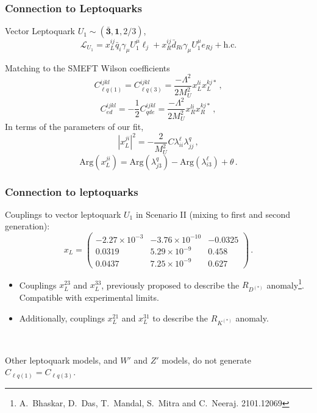 \documentclass[mathserif, 10pt]{beamer}
\begin{document}
\begin{frame}
\frametitle{Connection to Leptoquarks}

Vector Leptoquark $U_1 \sim (\bar{\mathbf{3}}, \mathbf{1}, 2/3)$,
$$\mathcal{L}_{U_1} = x_L^{ij} \bar{q}_i \gamma_\mu U_1^\mu \ell_j + x_R^{ij} \bar{d}_{Ri} \gamma_\mu U_1^\mu e_{Rj} + \mathrm{h.c.} $$

Matching to the SMEFT Wilson coefficients
$$C_{\ell q(1)}^{ijkl} = C_{\ell q(3)}^{ijkl} = \frac{-\Lambda^2}{2M_U^2}x_L^{li}x_L^{kj*}\,,$$
$$C_{ed}^{ijkl} = -\frac{1}{2}C_{qde}^{ijkl} = \frac{-\Lambda^2}{2M_U^2}x_R^{li}x_R^{kj*}\,,$$
In terms of the parameters of our fit,
$$|x_L^{ji}|^2 = -\frac{2}{M_U^2}C\lambda^\ell_{ii}\lambda^q_{jj}\,,$$
$$\mathrm{Arg}(x_L^{ji}) = \mathrm{Arg}(\lambda_{j3}^q)-\mathrm{Arg}(\lambda_{i3}^\ell) + \theta\,.$$ %

\end{frame}

\begin{frame}
\frametitle{Connection to leptoquarks}

Couplings to vector leptoquark $U_1$ in Scenario II (mixing to first and second generation):
$$x_L = \begin{pmatrix}
    -2.27\times10^{-3} & -3.76\times 10^{-10} & -0.0325 \\
    0.0319             & 5.29\times 10^{-9}   & 0.458   \\
    0.0437             & 7.25\times 10^{-9}   & 0.627
  \end{pmatrix}\,.
$$
\begin{itemize}
  \item Couplings $x_L^{23}$ and $x_L^{33}$, previously proposed to describe the $R_{D^{(*)}}$ anomaly\footnote[1]{A.~Bhaskar, D.~Das, T.~Mandal, S.~Mitra and C.~Neeraj. 2101.12069}. Compatible with experimental limits.
  \item Additionally, couplings $x_L^{21}$ and $x_L^{31}$ to describe the $R_{K^{(*)}}$ anomaly.
\end{itemize}

~

Other leptoquark models, and $W'$ and $Z'$ models, do not generate $C_{\ell q(1)} = C_{\ell q (3)}$.
\end{frame}
\end{document}
